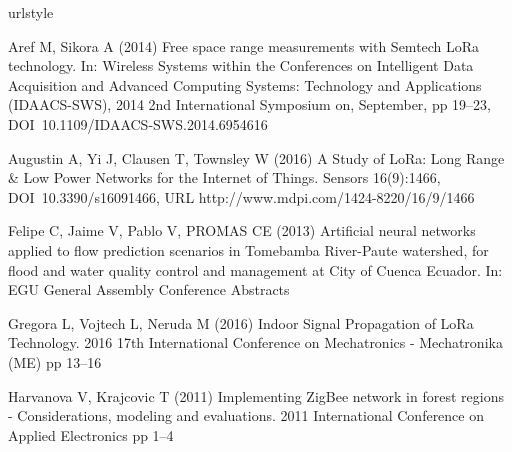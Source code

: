

\begin{thebibliography}{19}
\providecommand{\natexlab}[1]{#1}
\providecommand{\url}[1]{{#1}}
\providecommand{\urlprefix}{URL }
\expandafter\ifx\csname urlstyle\endcsname\relax
  \providecommand{\doi}[1]{DOI~\discretionary{}{}{}#1}\else
  \providecommand{\doi}{DOI~\discretionary{}{}{}\begingroup
  \urlstyle{rm}\Url}\fi
\providecommand{\eprint}[2][]{\url{#2}}

Aref M, Sikora A (2014) {Free space range measurements with Semtech LoRa
  technology}. In: Wireless Systems within the Conferences on Intelligent Data
  Acquisition and Advanced Computing Systems: Technology and Applications
  (IDAACS-SWS), 2014 2nd International Symposium on, September, pp 19--23,
  \doi{10.1109/IDAACS-SWS.2014.6954616}

Augustin A, Yi J, Clausen T, Townsley W (2016) {A Study of LoRa: Long Range
  {\&} Low Power Networks for the Internet of Things}. Sensors 16(9):1466,
  \doi{10.3390/s16091466},
  \urlprefix\url{http://www.mdpi.com/1424-8220/16/9/1466}

Felipe C, Jaime V, Pablo V, PROMAS CE (2013) {Artificial neural networks
  applied to flow prediction scenarios in Tomebamba River-Paute watershed, for
  flood and water quality control and management at City of Cuenca Ecuador}.
  In: EGU General Assembly Conference Abstracts

Gregora L, Vojtech L, Neruda M (2016) {Indoor Signal Propagation of LoRa
  Technology}. 2016 17th International Conference on Mechatronics -
  Mechatronika (ME) pp 13--16

Harvanova V, Krajcovic T (2011) {Implementing ZigBee network in forest regions
  - Considerations, modeling and evaluations}. 2011 International Conference on
  Applied Electronics pp 1--4


\end{thebibliography}
